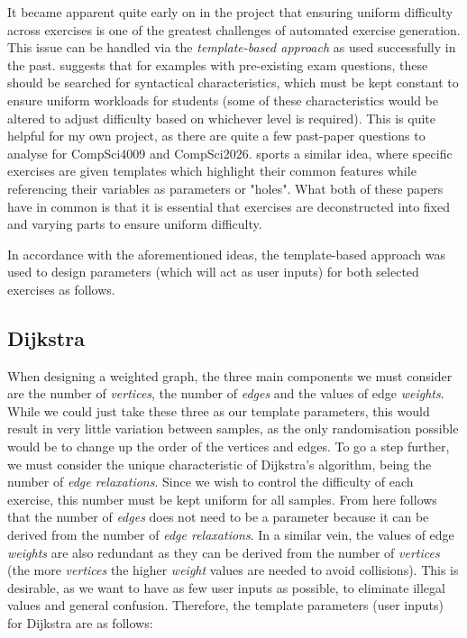 \documentclass{l4proj}
\begin{document}
It became apparent quite early on in the project that ensuring uniform difficulty across exercises is one of the greatest challenges of automated exercise generation. This issue can be handled via the \emph{template-based approach} as used successfully in the past. \citet{Hoz21} suggests that for examples with pre-existing exam questions, these should be searched for syntactical characteristics, which must be kept constant to ensure uniform workloads for students (some of these characteristics would be altered to adjust difficulty based on whichever level is required). This is quite helpful for my own project, as there are quite a few past-paper questions to analyse for CompSci4009 and CompSci2026. \citet{Sad12} sports a similar idea, where specific exercises are given templates which highlight their common features while referencing their variables as parameters or "holes". What both of these papers have in common is that it is essential that exercises are deconstructed into fixed and varying parts to ensure uniform difficulty.

In accordance with the aforementioned ideas, the template-based approach was used to design parameters (which will act as user inputs) for both selected exercises as follows.

\subsection{Dijkstra}
\label{sec:tdd}

When designing a weighted graph, the three main components we must consider are the number of \emph{vertices}, the number of \emph{edges} and the values of edge \emph{weights}. While we could just take these three as our template parameters, this would result in very little variation between samples, as the only randomisation possible would be to change up the order of the vertices and edges. To go a step further, we must consider the unique characteristic of Dijkstra's algorithm, being the number of \emph{edge relaxations}. Since we wish to control the difficulty of each exercise, this number must be kept uniform for all samples. From here follows that the number of \emph{edges} does not need to be a parameter because it can be derived from the number of \emph{edge relaxations}. In a similar vein, the values of edge \emph{weights} are also redundant as they can be derived from the number of \emph{vertices} (the more \emph{vertices} the higher \emph{weight} values are needed to avoid collisions). This is desirable, as we want to have as few user inputs as possible, to eliminate illegal values and general confusion. Therefore, the template parameters (user inputs) for Dijkstra are as follows:
\end{document}
